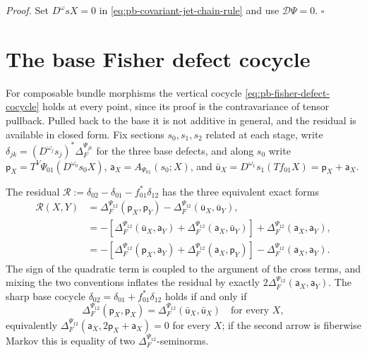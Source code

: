 \noindent\emph{Proof.}
Set \(D^\omega sX=0\) in \eqref{eq:pb-covariant-jet-chain-rule} and use \(\mathcal D\Psi=0\).
\hfill$\square$

\section{The base Fisher defect cocycle}
\label{sec:pb-base-defect-cocycle}

For composable bundle morphisms the vertical cocycle \eqref{eq:pb-fisher-defect-cocycle} holds at every
point, since its proof is the contravariance of tensor pullback. Pulled back to the base it is not
additive in general, and the residual is available in closed form. Fix sections \(s_0,s_1,s_2\)
related at each stage, write \(\delta_{jk}=(D^{\omega_j}s_j)^*\Delta_F^{\Psi_{jk}}\) for the three base
defects, and along \(s_0\) write \(\mathsf p_X=T^V\Psi_{01}(D^{\omega_0}s_0X)\),
\(\mathsf a_X=A_{\Psi_{01}}(s_0;X)\), and
\(\bar{\mathsf u}_X=D^{\omega_1}s_1(Tf_{01}X)=\mathsf p_X+\mathsf a_X\).

The residual \(\mathcal R:=\delta_{02}-\delta_{01}-f_{01}^*\delta_{12}\) has the three equivalent exact
forms
\begin{align}
\mathcal R(X,Y)
&=\Delta_F^{\Psi_{12}}(\mathsf p_X,\mathsf p_Y)-\Delta_F^{\Psi_{12}}(\bar{\mathsf u}_X,\bar{\mathsf u}_Y),
\label{eq:pb-base-cocycle-residual-a}\\
&=-\left[\Delta_F^{\Psi_{12}}(\bar{\mathsf u}_X,\mathsf a_Y)
+\Delta_F^{\Psi_{12}}(\mathsf a_X,\bar{\mathsf u}_Y)\right]
+\Delta_F^{\Psi_{12}}(\mathsf a_X,\mathsf a_Y),
\label{eq:pb-base-cocycle-residual-b}\\
&=-\left[\Delta_F^{\Psi_{12}}(\mathsf p_X,\mathsf a_Y)
+\Delta_F^{\Psi_{12}}(\mathsf a_X,\mathsf p_Y)\right]
-\Delta_F^{\Psi_{12}}(\mathsf a_X,\mathsf a_Y).
\label{eq:pb-base-cocycle-residual-c}
\end{align}
The sign of the quadratic term is coupled to the argument of the cross terms, and mixing the two
conventions inflates the residual by exactly \(2\Delta_F^{\Psi_{12}}(\mathsf a_X,\mathsf a_Y)\). The
sharp base cocycle \(\delta_{02}=\delta_{01}+f_{01}^*\delta_{12}\) holds if and only if
\begin{equation}
\Delta_F^{\Psi_{12}}(\mathsf p_X,\mathsf p_X)
=\Delta_F^{\Psi_{12}}(\bar{\mathsf u}_X,\bar{\mathsf u}_X)
\quad\text{for every }X,
\label{eq:pb-base-cocycle-criterion}
\end{equation}
equivalently \(\Delta_F^{\Psi_{12}}(\mathsf a_X,2\mathsf p_X+\mathsf a_X)=0\) for every \(X\); if the
second arrow is fiberwise Markov this is equality of two \(\Delta_F^{\Psi_{12}}\)-seminorms.


